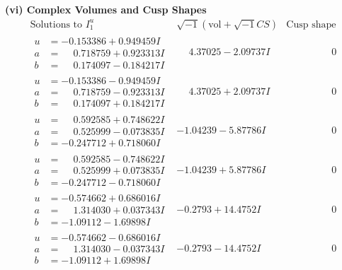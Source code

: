 \documentclass[1p]{elsarticle_modified}
\theoremstyle{definition}
\newcommand{\I}{\sqrt{-1}}
\begin{document}
\newpage\flushleft \textbf{(vi) Complex Volumes and Cusp Shapes}
$$\begin{array}{c|c|c}  
\text{Solutions to }I^u_{1}& \I (\text{vol} + \sqrt{-1}CS) & \text{Cusp shape}\\
 \hline 
\begin{aligned}
u &= -0.153386 + 0.949459 I \\
a &= \phantom{-}0.718759 + 0.923313 I \\
b &= \phantom{-}0.174097 - 0.184217 I\end{aligned}
 & \phantom{-}4.37025 - 2.09737 I & \phantom{-0.000000 } 0 \\ \hline\begin{aligned}
u &= -0.153386 - 0.949459 I \\
a &= \phantom{-}0.718759 - 0.923313 I \\
b &= \phantom{-}0.174097 + 0.184217 I\end{aligned}
 & \phantom{-}4.37025 + 2.09737 I & \phantom{-0.000000 } 0 \\ \hline\begin{aligned}
u &= \phantom{-}0.592585 + 0.748622 I \\
a &= \phantom{-}0.525999 - 0.073835 I \\
b &= -0.247712 + 0.718060 I\end{aligned}
 & -1.04239 - 5.87786 I & \phantom{-0.000000 } 0 \\ \hline\begin{aligned}
u &= \phantom{-}0.592585 - 0.748622 I \\
a &= \phantom{-}0.525999 + 0.073835 I \\
b &= -0.247712 - 0.718060 I\end{aligned}
 & -1.04239 + 5.87786 I & \phantom{-0.000000 } 0 \\ \hline\begin{aligned}
u &= -0.574662 + 0.686016 I \\
a &= \phantom{-}1.314030 + 0.037343 I \\
b &= -1.09112 - 1.69898 I\end{aligned}
 & -0.2793 + 14.4752 I & \phantom{-0.000000 } 0 \\ \hline\begin{aligned}
u &= -0.574662 - 0.686016 I \\
a &= \phantom{-}1.314030 - 0.037343 I \\
b &= -1.09112 + 1.69898 I\end{aligned}
 & -0.2793 - 14.4752 I & \phantom{-0.000000 } 0 \\ \hline\begin{aligned}

\end{aligned}
\end{array}$$
\end{document}
